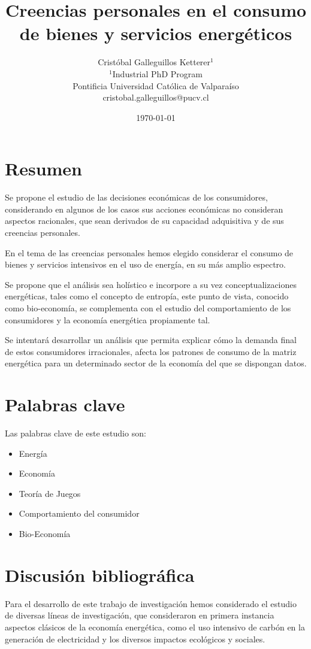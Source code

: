 \documentclass{article}
\title{Creencias personales en el consumo de bienes y servicios energéticos}
\author{Cristóbal Galleguillos Ketterer$^{1}$\\
\small{$^{1}$Industrial PhD Program}\\
\small{Pontificia Universidad Católica de Valparaíso}\\
\small{cristobal.galleguillos@pucv.cl}
}
\date{\small{\today}}
\begin{document}
\maketitle

\section{Resumen}

Se propone el estudio de las decisiones económicas de los consumidores, considerando en algunos de los casos sus acciones económicas no consideran aspectos racionales, que sean derivados de su capacidad adquisitiva y de sus creencias personales.

En el tema de las creencias personales hemos elegido considerar el consumo de bienes y servicios intensivos en el uso de energía, en su más amplio espectro.

Se propone que el análisis sea holístico e incorpore a su vez conceptualizaciones energéticas, tales como el concepto de entropía, este punto de vista, conocido como bio-economía, se complementa con el estudio del comportamiento de los consumidores y la economía energética propiamente tal.

Se intentará desarrollar un análisis que permita explicar cómo la demanda final de estos consumidores irracionales, afecta los patrones de consumo de la matriz energética para un determinado sector de la economía del que se dispongan datos.

\section{Palabras clave}

Las palabras clave de este estudio son:

\begin{itemize}
    \item Energía
    \item Economía
    \item Teoría de Juegos
    \item Comportamiento del consumidor
    \item Bio-Economía
    
\end{itemize}

\section{Discusión bibliográfica}
 
Para el desarrollo de este trabajo de investigación hemos considerado el estudio de diversas líneas de investigación, que consideraron en primera instancia aspectos clásicos de la economía energética, como el uso intensivo de carbón en la generación de electricidad y los diversos impactos ecológicos y sociales.
\end{document}
